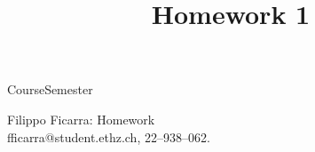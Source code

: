 \documentclass{ETHExercise}
\title{Homework 1}
\begin{document}
{}
{\Large Course}{Semester}
\begin{center}
    {\Huge Filippo Ficarra: Homework }\\
      \quad\newline
      fficarra@student.ethz.ch, 22--938--062.\\
      \quad\newline
\end{center}
\end{document}
